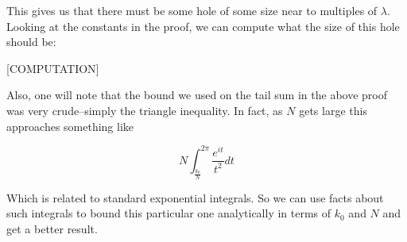 \documentclass{article}
\theoremstyle{definition}
\theoremstyle{remark}
\numberwithin{equation}{section}
\begin{document}
This gives us that there must be some hole of some size near to
multiples of $\lambda$.  Looking at the constants in the proof, we can
compute what the size of this hole should be: 

{\color{red}

[COMPUTATION]

Also, one will note that the bound we used on the tail sum in the
above proof was very crude--simply the triangle inequality.  In fact,
as $N$ gets large this approaches something like

\[N \int_{\frac{k_0}{N}}^{2\pi} \frac{e^{it}}{t^2}dt\]

Which is related to standard exponential integrals.  So we can use
facts about such integrals to bound this particular one analytically
in terms of $k_0$ and $N$ and get a better result.

}







\end{document}
